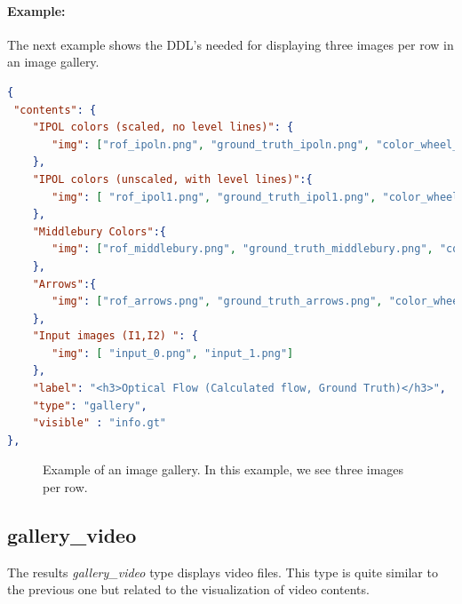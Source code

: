 \paragraph{Example:}
The next example shows the DDL's needed for displaying three images per row in an image gallery.
\begin{lstlisting}[language=json,firstnumber=1]
{
 "contents": {
    "IPOL colors (scaled, no level lines)": {
       "img": ["rof_ipoln.png", "ground_truth_ipoln.png", "color_wheel_ipoln.png"]
    },
    "IPOL colors (unscaled, with level lines)":{
       "img": [ "rof_ipol1.png", "ground_truth_ipol1.png", "color_wheel_ipol1.png"]
    },
    "Middlebury Colors":{
       "img": ["rof_middlebury.png", "ground_truth_middlebury.png", "color_wheel_middlebury.png"]
    },
    "Arrows":{
       "img": ["rof_arrows.png", "ground_truth_arrows.png", "color_wheel_arrows.png"]
    },
    "Input images (I1,I2) ": {
       "img": [ "input_0.png", "input_1.png"]
    },
    "label": "<h3>Optical Flow (Calculated flow, Ground Truth)</h3>", 
    "type": "gallery",
    "visible" : "info.gt"
},
\end{lstlisting}

\begin{figure}[h]
\centering
{}
\caption{Example of an image gallery. In this example, we see three images per row.}
\label{fig:image_gallery_example}
\end{figure}

\subsection{gallery\_video}

The results \emph{gallery\_video} type displays video files. This type is quite similar to the previous one but related to the visualization of video contents.

